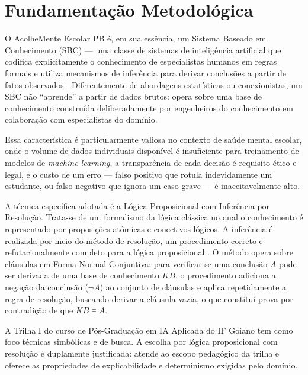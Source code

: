 \documentclass[
    12pt,
    openright,
    oneside,
    a4paper,
    english,
    brazil
]{abntex2}
\begin{document}
\chapter{Fundamenta\c{c}\~ao Metodol\'ogica}

O AcolheMente Escolar PB \'e, em sua ess\^encia, um Sistema Baseado em Conhecimento (SBC) --- uma classe de sistemas de intelig\^encia artificial que codifica explicitamente o conhecimento de especialistas humanos em regras formais e utiliza mecanismos de infer\^encia para derivar conclus\~oes a partir de fatos observados \cite{brachman_levesque_2004}. Diferentemente de abordagens estat\'isticas ou conexionistas, um SBC n\~ao ``aprende'' a partir de dados brutos: opera sobre uma base de conhecimento constru\'ida deliberadamente por engenheiros do conhecimento em colabora\c{c}\~ao com especialistas do dom\'inio.

Essa caracter\'istica \'e particularmente valiosa no contexto de sa\'ude mental escolar, onde o volume de dados individuais dispon\'ivel \'e insuficiente para treinamento de modelos de \textit{machine learning}, a transpar\^encia de cada decis\~ao \'e requisito \'etico e legal, e o custo de um erro --- falso positivo que rotula indevidamente um estudante, ou falso negativo que ignora um caso grave --- \'e inaceitavelmente alto.

A t\'ecnica espec\'ifica adotada \'e a L\'ogica Proposicional com Infer\^encia por Resolu\c{c}\~ao. Trata-se de um formalismo da l\'ogica cl\'assica no qual o conhecimento \'e representado por proposi\c{c}\~oes at\^omicas e conectivos l\'ogicos. A infer\^encia \'e realizada por meio do m\'etodo de resolu\c{c}\~ao, um procedimento correto e refutacionalmente completo para a l\'ogica proposicional \cite{genesereth_nilsson_1987}. O m\'etodo opera sobre cl\'ausulas em Forma Normal Conjuntiva: para verificar se uma conclus\~ao $A$ pode ser derivada de uma base de conhecimento $KB$, o procedimento adiciona a nega\c{c}\~ao da conclus\~ao ($\neg A$) ao conjunto de cl\'ausulas e aplica repetidamente a regra de resolu\c{c}\~ao, buscando derivar a cl\'ausula vazia, o que constitui prova por contradi\c{c}\~ao de que $KB \models A$.

A Trilha I do curso de P\'os-Gradua\c{c}\~ao em IA Aplicada do IF Goiano tem como foco t\'ecnicas simb\'olicas e de busca. A escolha por l\'ogica proposicional com resolu\c{c}\~ao \'e duplamente justificada: atende ao escopo pedag\'ogico da trilha e oferece as propriedades de explicabilidade e determinismo exigidas pelo dom\'inio.
\end{document}
